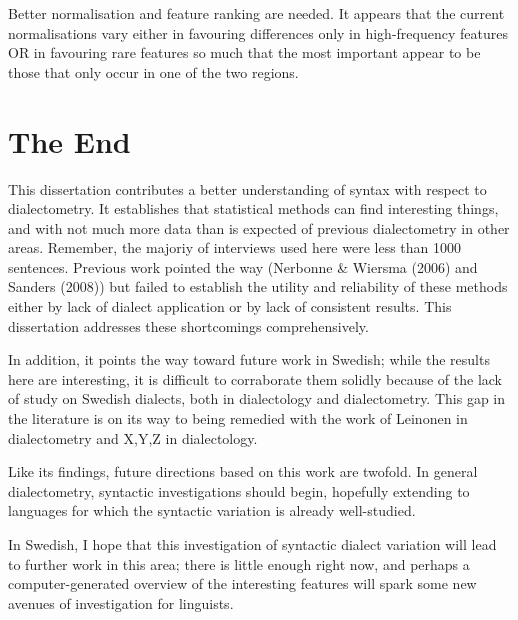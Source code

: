 Better normalisation and feature ranking are needed. It appears that
the current normalisations vary either in favouring differences
only in high-frequency features OR in favouring rare features so much
that the most important appear to be those that only occur in one of
the two regions.

\section{The End}

This dissertation contributes a better understanding of syntax with
respect to dialectometry. It establishes that statistical methods can
find interesting things, and with not much more data than is expected
of previous dialectometry in other areas. Remember, the majoriy of
interviews used here were less than 1000 sentences. Previous work
pointed the way (Nerbonne \& Wiersma (2006) and Sanders (2008)) but
failed to establish the utility and reliability of these methods
either by lack of dialect application or by lack of consistent
results. This dissertation addresses these shortcomings
comprehensively.

In addition, it points the way toward future work in Swedish; while
the results here are interesting, it is difficult to corraborate them
solidly because of the lack of study on Swedish dialects, both in
dialectology and dialectometry. This gap in the literature is on its
way to being remedied with the work of Leinonen in dialectometry and
X,Y,Z in dialectology.

Like its findings, future directions based on this work are
twofold. In general dialectometry, syntactic investigations should
begin, hopefully extending to languages for which the syntactic
variation is already well-studied.

In Swedish, I hope that this investigation of syntactic dialect
variation will lead to further work in this area; there is little
enough right now, and perhaps a computer-generated overview of the
interesting features will spark some new avenues of investigation for
linguists.

